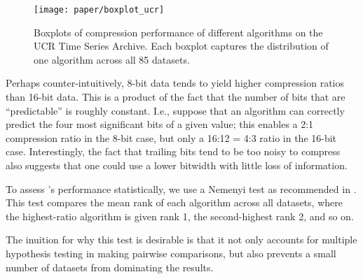\begin{figure}[h]
\begin{center}
    \texttt{[image: paper/boxplot\_ucr]}
    \caption{Boxplots of compression performance of different algorithms on the UCR Time Series Archive. Each boxplot captures the distribution of one algorithm across all 85 datasets.}
    \label{fig:ratioBox}
\end{center}
\end{figure}

Perhaps counter-intuitively, 8-bit data tends to yield higher compression ratios than 16-bit data. This is a product of the fact that the number of bits that are ``predictable'' is roughly constant. I.e., suppose that an algorithm can correctly predict the four most significant bits of a given value; this enables a 2:1 compression ratio in the 8-bit case, but only a 16:12 = 4:3 ratio in the 16-bit case. Interestingly, the fact that trailing bits tend to be too noisy to compress also suggests that one could use a lower bitwidth with little loss of information. %

To assess \mine's performance statistically, we use a Nemenyi test \cite{nemenyiTest} as recommended in \cite{cdDiagrams}. This test compares the mean rank of each algorithm across all datasets, where the highest-ratio algorithm is given rank 1, the second-highest rank 2, and so on.

The inuition for why this test is desirable is that it not only accounts for multiple hypothesis testing in making pairwise comparisons, but also prevents a small number of datasets from dominating the results.


